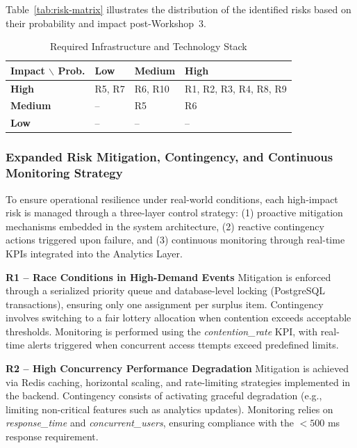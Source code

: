 \documentclass[9pt,conference]{IEEEtran}
\begin{document}
Table~\ref{tab:risk-matrix} illustrates the distribution of the identified risks based on their probability and impact post-Workshop~3.
\begin{table}[h]
\centering
\small
\caption{Required Infrastructure and Technology Stack}
\label{tab:infrastructure}
\begin{tabular}{@{}p{2.0cm}p{1.8cm}p{1.8cm}p{2.0cm}@{}}
\toprule
\textbf{Impact $\backslash$ Prob.} & \textbf{Low} & \textbf{Medium} & \textbf{High} \\
\midrule
\textbf{High}   & R5, R7 & R6, R10 & R1, R2, R3, R4, R8, R9 \\
\addlinespace
\textbf{Medium} & --     & R5      & R6 \\
\addlinespace
\textbf{Low}    & --     & --      & -- \\
\bottomrule
\end{tabular}
\end{table}


\subsubsection{Expanded Risk Mitigation, Contingency, and Continuous Monitoring Strategy}

To ensure operational resilience under real-world conditions, each high-impact risk is managed through a three-layer control strategy: (1) proactive mitigation mechanisms embedded in the system architecture, (2) reactive contingency actions triggered upon failure, and (3) continuous monitoring through real-time KPIs integrated into the Analytics Layer.

\textbf{R1 – Race Conditions in High-Demand Events}  
Mitigation is enforced through a serialized priority queue and database-level locking (PostgreSQL transactions), ensuring only one assignment per surplus item.  
Contingency involves switching to a fair lottery allocation when contention exceeds acceptable thresholds.  
Monitoring is performed using the \textit{contention\_rate} KPI, with real-time alerts triggered when concurrent access ttempts exceed predefined limits.

\textbf{R2 – High Concurrency Performance Degradation}  
Mitigation is achieved via Redis caching, horizontal scaling, and rate-limiting strategies implemented in the backend.  
Contingency consists of activating graceful degradation (e.g., limiting non-critical features such as analytics updates).  
Monitoring relies on \textit{response\_time} and \textit{concurrent\_users}, ensuring compliance with the $<500$ ms response requirement.
\end{document}
